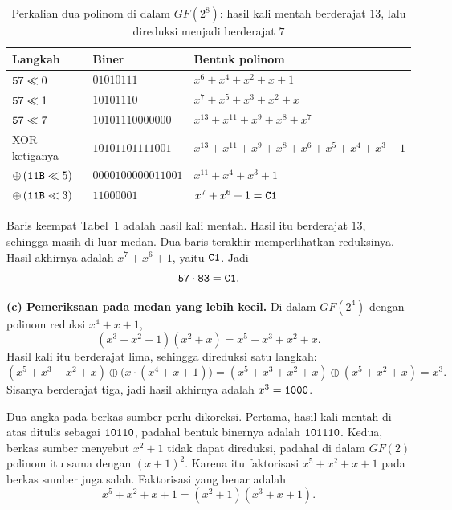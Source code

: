 \begin{example}
\begin{table}[htbp]
    \centering
    \caption{Perkalian dua polinom di dalam $GF(2^8)$: hasil kali mentah
    berderajat $13$, lalu direduksi menjadi berderajat $7$}
    \label{tab:gf2m-kali}
    \begin{tabular}{@{}l l l@{}}
    \toprule
    \textbf{Langkah} & \textbf{Biner} & \textbf{Bentuk polinom} \\
    \midrule
    $\texttt{57} \ll 0$        & $01010111$          & $x^6 + x^4 + x^2 + x + 1$ \\
    \addlinespace
    $\texttt{57} \ll 1$        & $10101110$          & $x^7 + x^5 + x^3 + x^2 + x$ \\
    \addlinespace
    $\texttt{57} \ll 7$        & $10101110000000$    & $x^{13} + x^{11} + x^9 + x^8 + x^7$ \\
    \midrule
    XOR ketiganya            & $10101101111001$    & $x^{13} + x^{11} + x^9 + x^8 + x^6
                             + x^5 + x^4 + x^3 + 1$ \\
    \midrule
    $\oplus\,(\texttt{11B} \ll 5)$ & $0000100000011001$ & $x^{11} + x^4 + x^3 + 1$ \\
    \addlinespace
    $\oplus\,(\texttt{11B} \ll 3)$ & $11000001$         & $x^7 + x^6 + 1 = \texttt{C1}$ \\
    \bottomrule
    \end{tabular}
\end{table}

Baris keempat Tabel~\ref{tab:gf2m-kali} adalah hasil kali mentah. Hasil itu
berderajat $13$, sehingga masih di luar medan. Dua baris terakhir
memperlihatkan reduksinya. Hasil akhirnya adalah $x^7 + x^6 + 1$, yaitu
$\texttt{C1}$. Jadi
\[
\texttt{57} \cdot \texttt{83} = \texttt{C1} .
\]

\textbf{(c) Pemeriksaan pada medan yang lebih kecil.} Di dalam $GF(2^4)$ dengan
polinom reduksi $x^4 + x + 1$,
\[
(x^3 + x^2 + 1)(x^2 + x) = x^5 + x^3 + x^2 + x .
\]
Hasil kali itu berderajat lima, sehingga direduksi satu langkah:
\[
(x^5 + x^3 + x^2 + x) \oplus \bigl(x \cdot (x^4 + x + 1)\bigr)
= (x^5 + x^3 + x^2 + x) \oplus (x^5 + x^2 + x) = x^3 .
\]
Sisanya berderajat tiga, jadi hasil akhirnya adalah $x^3 = \texttt{1000}$.


Dua angka pada berkas sumber perlu dikoreksi. Pertama, hasil kali mentah di
atas ditulis sebagai $\texttt{10110}$, padahal bentuk binernya adalah
$\texttt{101110}$. Kedua, berkas sumber menyebut $x^2 + 1$ tidak dapat
direduksi, padahal di dalam $GF(2)$ polinom itu sama dengan $(x+1)^2$. Karena
itu faktorisasi $x^5 + x^2 + x + 1$ pada berkas sumber juga salah. Faktorisasi
yang benar adalah
\[
x^5 + x^2 + x + 1 = (x^2 + 1)(x^3 + x + 1) .
\]
\end{example}

